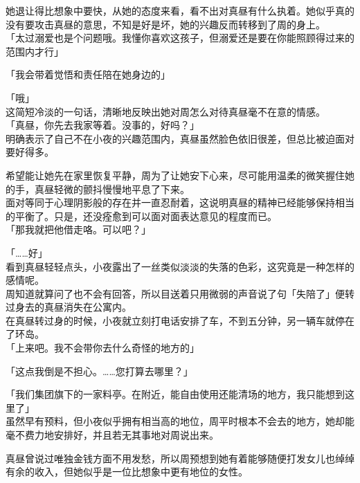 她退让得比想象中要快，从她的态度来看，看不出对真昼有什么执着。她似乎真的没有要攻击真昼的意思，不知是好是坏，她的兴趣反而转移到了周的身上。\\

「太过溺爱也是个问题哦。我懂你喜欢这孩子，但溺爱还是要在你能照顾得过来的范围内才行」

「我会带着觉悟和责任陪在她身边的」

「哦」\\

这简短冷淡的一句话，清晰地反映出她对周怎么对待真昼毫不在意的情感。\\

「真昼，你先去我家等着。没事的，好吗？」\\

明确表示了自己不在小夜的兴趣范围内，真昼虽然脸色依旧很差，但总比被迫面对要好得多。

希望能让她先在家里恢复平静，周为了让她安下心来，尽可能用温柔的微笑握住她的手，真昼轻微的颤抖慢慢地平息了下来。\\

面对等同于心理阴影般的存在并一直忍耐着，这说明真昼的精神已经能够保持相当的平衡了。只是，还没痊愈到可以面对面表达意见的程度而已。\\

「那我就把他借走咯。可以吧？」

「……好」\\

看到真昼轻轻点头，小夜露出了一丝类似淡淡的失落的色彩，这究竟是一种怎样的感情呢。\\

周知道就算问了也不会有回答，所以目送着只用微弱的声音说了句「失陪了」便转过身去的真昼消失在公寓内。\\

在真昼转过身的时候，小夜就立刻打电话安排了车，不到五分钟，另一辆车就停在了环岛。\\

「上来吧。我不会带你去什么奇怪的地方的」　

「这点我倒是不担心。……您打算去哪里？」

「我们集团旗下的一家料亭。在附近，能自由使用还能清场的地方，我只能想到这里了」\\

虽然早有预料，但小夜似乎拥有相当高的地位，周平时根本不会去的地方，她却能毫不费力地安排好，并且若无其事地对周说出来。

真昼曾说过唯独金钱方面不用发愁，所以周预想到她有着能够随便打发女儿也绰绰有余的收入，但她似乎是一位比想象中更有地位的女性。\\

